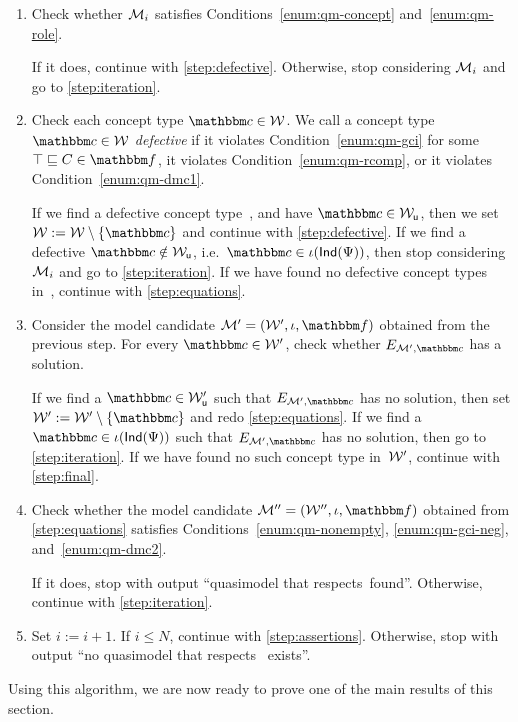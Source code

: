 \begin{enumerate}[label=\emph{Step~\arabic*.},ref=Step~\arabic*,leftmargin=4em]
    \item\label{step:assertions}
        Check whether $\mathcal{M}_i$ satisfies Conditions~\ref{enum:qm-concept}
        and~\ref{enum:qm-role}.

        If it does, continue with \ref{step:defective}.  Otherwise, stop
        considering $\mathcal{M}_i$ and go to \ref{step:iteration}.

    \item\label{step:defective}
        Check each concept type $\cbb\in\Wmc$.  We call a concept
        type~$\cbb\in\Wmc$ \emph{defective} if it violates
        Condition~\ref{enum:qm-gci} for some $\top\sqsubseteq C\in\fbb$, it
        violates Condition~\ref{enum:qm-rcomp}, or it violates
        Condition~\ref{enum:qm-dmc1}.

        If we find a defective concept type~\cbb, and have $\cbb\in\Wmcu$, then
        we set $\Wmc:=\Wmc\setminus\{\cbb\}$ and continue with
        \ref{step:defective}.
        If we find a defective $\cbb\notin\Wmcu$,
        i.e.~$\cbb\in\iota(\Ind(\Psi))$, then stop considering $\mathcal{M}_i$ and go
        to \ref{step:iteration}.
        If we have found no defective concept types in~\Wmc, continue with
        \ref{step:equations}.

    \item\label{step:equations}
        Consider the model candidate $\Mmc'=(\Wmc',\iota,\fbb)$ obtained from
        the previous step.  For every $\cbb\in\Wmc'$, check whether
        $E_{\Mmc',\cbb}$ has a solution.

        If we find a $\cbb\in\Wmcu'$ such that $E_{\Mmc',\cbb}$ has no solution,
        then set $\Wmc':=\Wmc'\setminus\{\cbb\}$ and redo \ref{step:equations}.
        If we find a $\cbb\in\iota(\Ind(\Psi))$ such that $E_{\Mmc',\cbb}$ has
        no solution, then go to \ref{step:iteration}.
        If we have found no such concept type in~$\mathcal{W}'$, continue with
        \ref{step:final}.

    \item\label{step:final}
        Check whether the model candidate $\Mmc''=(\Wmc'',\iota,\fbb)$ obtained
        from \ref{step:equations} satisfies Conditions~\ref{enum:qm-nonempty},
        \ref{enum:qm-gci-neg}, and~\ref{enum:qm-dmc2}.

        If it does, stop with output \enquote{quasimodel that respects~\Dmc found}.
        Otherwise, continue with \ref{step:iteration}.

    \item\label{step:iteration}
        Set $i:=i+1$. If $i\leq N$, continue with \ref{step:assertions}.
        Otherwise, stop with output \enquote{no quasimodel that respects~\Dmc
        exists}.
\end{enumerate}
%
Using this algorithm, we are now ready to prove one of the main results of this
section.

